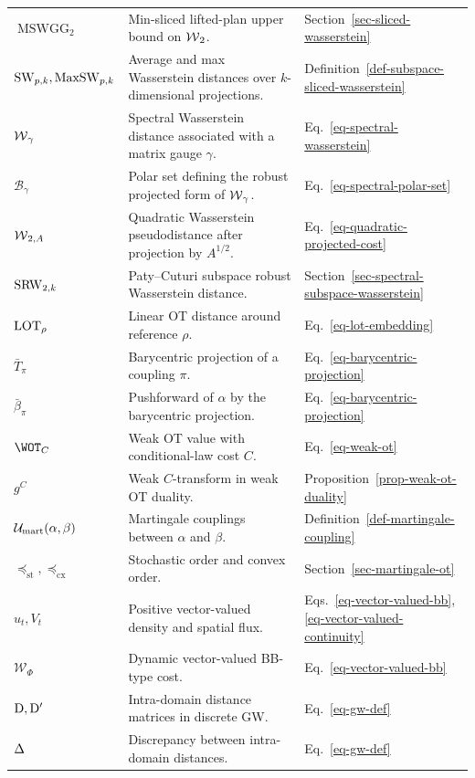 {\begin{longtable}{>{\raggedright\arraybackslash}p{}
                  >{\raggedright\arraybackslash}p{}
                  >{\raggedright\arraybackslash}p{}}
$\operatorname{MSWGG}_2$ & Min-sliced lifted-plan upper bound on $\operatorname{\mathcal{W}}_2$. & Section~\ref{sec-sliced-wasserstein} \\
$\operatorname{SW}_{p,k},\operatorname{MaxSW}_{p,k}$ & Average and max Wasserstein distances over $k$-dimensional projections. & Definition~\ref{def-subspace-sliced-wasserstein} \\
$\operatorname{\mathcal{W}}_\gamma$ & Spectral Wasserstein distance associated with a matrix gauge $\gamma$. & Eq.~\eqref{eq-spectral-wasserstein} \\
$\mathcal B_\gamma$ & Polar set defining the robust projected form of $\operatorname{\mathcal{W}}_\gamma$. & Eq.~\eqref{eq-spectral-polar-set} \\
$\operatorname{\mathcal{W}}_{2,A}$ & Quadratic Wasserstein pseudodistance after projection by $A^{1/2}$. & Eq.~\eqref{eq-quadratic-projected-cost} \\
$\operatorname{SRW}_{2,k}$ & Paty--Cuturi subspace robust Wasserstein distance. & Section~\ref{sec-spectral-subspace-wasserstein} \\
$\operatorname{LOT}_\rho$ & Linear OT distance around reference $\rho$. & Eq.~\eqref{eq-lot-embedding} \\
$\bar T_\pi$ & Barycentric projection of a coupling $\pi$. & Eq.~\eqref{eq-barycentric-projection} \\
$\bar\beta_\pi$ & Pushforward of $\alpha$ by the barycentric projection. & Eq.~\eqref{eq-barycentric-projection} \\
$\WOT_C$ & Weak OT value with conditional-law cost $C$. & Eq.~\eqref{eq-weak-ot} \\
$g^C$ & Weak $C$-transform in weak OT duality. & Proposition~\ref{prop-weak-ot-duality} \\
$\mathcal{U}_{\mathrm{mart}}(\alpha,\beta)$ & Martingale couplings between $\alpha$ and $\beta$. & Definition~\ref{def-martingale-coupling} \\
$\preceq_{\mathrm{st}},\preceq_{\mathrm{cx}}$ & Stochastic order and convex order. & Section~\ref{sec-martingale-ot} \\
$u_t,V_t$ & Positive vector-valued density and spatial flux. & Eqs.~\eqref{eq-vector-valued-bb}, \eqref{eq-vector-valued-continuity} \\
$\mathcal W_{\Phi}$ & Dynamic vector-valued BB-type cost. & Eq.~\eqref{eq-vector-valued-bb} \\
$\mathrm{D},\mathrm{D}'$ & Intra-domain distance matrices in discrete GW. & Eq.~\eqref{eq-gw-def} \\
$\Delta$ & Discrepancy between intra-domain distances. & Eq.~\eqref{eq-gw-def} \\

\end{longtable}}
